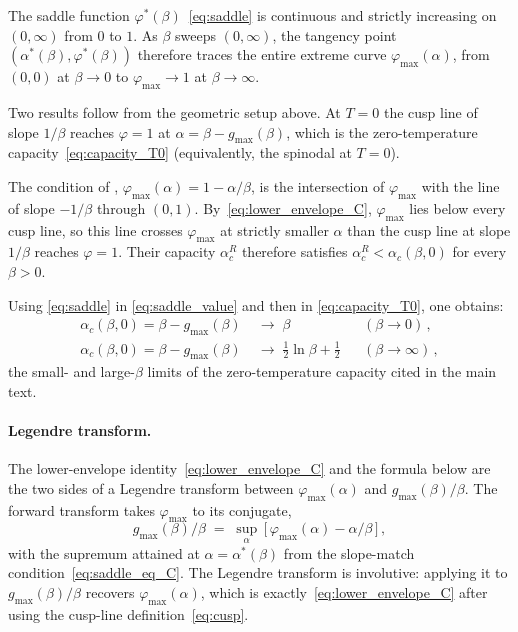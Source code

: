 \documentclass[letterpaper]{article} %
\newcommand{\Bnet}{\beta}
\newcommand{\ac}{\alpha_c}
\begin{document}
The saddle function $\varphi^*(\Bnet)$~\eqref{eq:saddle} is
continuous and strictly increasing on $(0, \infty)$ from $0$ to $1$. As $\Bnet$ sweeps $(0, \infty)$,
the tangency point $(\alpha^*(\Bnet), \varphi^*(\Bnet))$ therefore traces the
entire extreme curve $\varphi_{\max}(\alpha)$, from $(0, 0)$ at $\Bnet \to 0$ to $\varphi_{\max} \to 1$ at $\Bnet \to \infty$.

Two results follow from the geometric setup above.  At $T = 0$ the
cusp line of slope $1/\Bnet$ reaches $\varphi = 1$ at
$\alpha = \Bnet - g_{\max}(\Bnet)$, which is the zero-temperature
capacity~\eqref{eq:capacity_T0} (equivalently, the spinodal at
$T = 0$).

The condition of \citet{ramsauer2021hopfield},
$\varphi_{\max}(\alpha) = 1 - \alpha/\Bnet$, is the intersection of
$\varphi_{\max}$ with the line of slope $-1/\Bnet$ through $(0, 1)$.
By~\eqref{eq:lower_envelope_C}, $\varphi_{\max}$ lies below every
cusp line, so this line crosses $\varphi_{\max}$ at strictly
smaller $\alpha$ than the cusp line at slope $1/\Bnet$ reaches
$\varphi = 1$.  Their capacity $\alpha_c^R$ therefore satisfies
$\alpha_c^R < \alpha_c(\Bnet, 0)$ for every $\Bnet > 0$.

Using \eqref{eq:saddle} in
\eqref{eq:saddle_value} and then in \eqref{eq:capacity_T0}, one obtains:
\begin{equation}
\begin{aligned}
\ac(\Bnet, 0) = \Bnet - g_{\max}(\Bnet) &\;\to\; \Bnet
   && (\Bnet \to 0)\,,\\
\ac(\Bnet, 0) = \Bnet - g_{\max}(\Bnet) &\;\to\; \tfrac{1}{2}\ln\Bnet + \tfrac{1}{2}
   && (\Bnet \to \infty)\,,
\end{aligned}
\label{eq:asymptotic_C}
\end{equation}
the small- and large-$\Bnet$ limits of the zero-temperature capacity
cited in the main text.

\paragraph{Legendre transform.}
The lower-envelope identity~\eqref{eq:lower_envelope_C} and the formula
below are the two sides of a Legendre transform between
$\varphi_{\max}(\alpha)$ and $g_{\max}(\Bnet)/\Bnet$.  The forward
transform takes $\varphi_{\max}$ to its conjugate,
\begin{equation}
g_{\max}(\Bnet)/\Bnet \;=\; \sup_\alpha\,\bigl[\,\varphi_{\max}(\alpha) - \alpha/\Bnet\,\bigr]\,,
\label{eq:legendre_C}
\end{equation}
with the supremum attained at $\alpha = \alpha^*(\Bnet)$ from the
slope-match condition~\eqref{eq:saddle_eq_C}.  The Legendre transform
is involutive: applying it to $g_{\max}(\Bnet)/\Bnet$ recovers
$\varphi_{\max}(\alpha)$, which is exactly~\eqref{eq:lower_envelope_C}
after using the cusp-line definition~\eqref{eq:cusp}.
\end{document}
